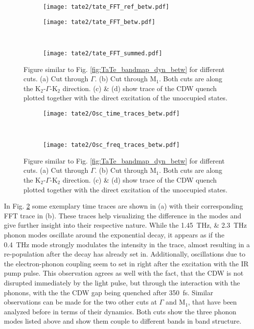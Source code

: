 \begin{figure}[h!]
	\centering
	\begin{subfigure}[b]{0.24\textwidth}
		\texttt{[image: tate2/tate\_FFT\_ref\_betw.pdf]}
		\caption{}
	\end{subfigure}
	\begin{subfigure}[b]{0.72\textwidth}
		\texttt{[image: tate2/tate\_FFT\_betw.pdf]}
		\caption{}
	\end{subfigure}
	\\
	\begin{subfigure}[b]{0.33\textwidth}
		\texttt{[image: tate2/tate\_FFT\_summed.pdf]}
		\caption{}
	\end{subfigure}
	\caption{Figure similar to Fig. \ref{fig:TaTe_bandmap_dyn_betw} for different cuts. (a) Cut through $\Gamma$. (b) Cut through M$_1$. Both cuts are along the K$_2$-$\Gamma$-K$_2$ direction. (c) \& (d) show trace of the CDW quench plotted together with the direct excitation of the unoccupied states.}
	\label{fig:TaTe_FFT_betw}
\end{figure}

\begin{figure}[bh!]
	\centering
	\begin{subfigure}[b]{\textwidth}
		\texttt{[image: tate2/Osc\_time\_traces\_betw.pdf]}
		\caption{}
	\end{subfigure}
	\\
	\begin{subfigure}[b]{\textwidth}
		\texttt{[image: tate2/Osc\_freq\_traces\_betw.pdf]}
		\caption{}
	\end{subfigure}
	\caption{Figure similar to Fig. \ref{fig:TaTe_bandmap_dyn_betw} for different cuts. (a) Cut through $\Gamma$. (b) Cut through M$_1$. Both cuts are along the K$_2$-$\Gamma$-K$_2$ direction. (c) \& (d) show trace of the CDW quench plotted together with the direct excitation of the unoccupied states.}
	\label{fig:TaTe_FFT_traces_betw}
\end{figure}

In Fig. \ref{fig:TaTe_FFT_traces_betw} some exemplary time traces are shown in (a) with their corresponding FFT trace in (b).
These traces help visualizing the difference in the modes and give further insight into their respective nature.
While the \qtylist{1.45; 2.3}{\tera\hertz} phonon modes oscillate around the exponential decay, it appears as if the \qty{0.4}{\tera\hertz} mode strongly modulates the intensity in the trace, almost resulting in a re-population after the decay has already set in.
Additionally, oscillations due to the electron-phonon coupling seem to set in right after the excitation with the IR pump pulse.
This observation agrees as well with the fact, that the CDW is not disrupted immediately by the light pulse, but through the interaction with the phonons, with the the CDW gap being quenched after \qty{350}{\femto\second}.
Similar observations can be made for the two other cuts at $\Gamma$ and M$_1$, that have been analyzed before in terms of their dynamics.
Both cuts show the three phonon modes listed above and show them couple to different bands in band structure.

